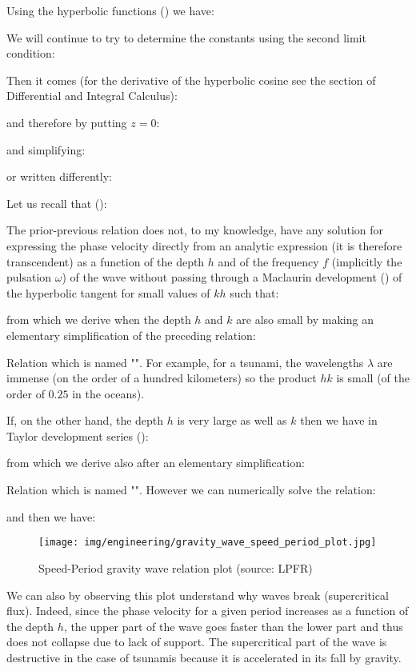 	Using the hyperbolic functions () we have:
	
	We will continue to try to determine the constants using the second limit condition:
	
	Then it comes (for the derivative of the hyperbolic cosine see the section of Differential and Integral Calculus):
	
	and therefore by putting $z=0$:
	
	and simplifying:
	
	or written differently:
	
	Let us recall that ():
	
	The prior-previous relation does not, to my knowledge, have any solution for expressing the phase velocity directly from an analytic expression (it is therefore transcendent) as a function of the depth $h$ and of the frequency $f$ (implicitly the pulsation $\omega$) of the wave without passing through a Maclaurin development () of the hyperbolic tangent for small values of $kh$ such that:
	
	from which we derive when the depth $h$ and $k$ are also small by making an elementary simplification of the preceding relation:
	
	Relation which is named "". For example, for a tsunami, the wavelengths $\lambda$ are immense (on the order of a hundred kilometers) so the product $hk$ is small (of the order of $0.25$ in the oceans).

	If, on the other hand, the depth $h$ is very large as well as $k$ then we have in Taylor development  series ():
	
	from which we derive also after an elementary simplification:
	
	Relation which is named "".
	However we can numerically solve the relation:
	
	and then we have:
	\begin{figure}[H]
		\centering
		\texttt{[image: img/engineering/gravity\_wave\_speed\_period\_plot.jpg]}	
		\caption{Speed-Period gravity wave relation plot (source: LPFR)}
	\end{figure}
	We can also by observing this plot understand why waves break (supercritical flux). Indeed, since the phase velocity for a given period increases as a function of the depth $h$, the upper part of the wave goes faster than the lower part and thus does not collapse due to lack of support. The supercritical part of the wave is destructive in the case of tsunamis because it is accelerated in its fall by gravity.

